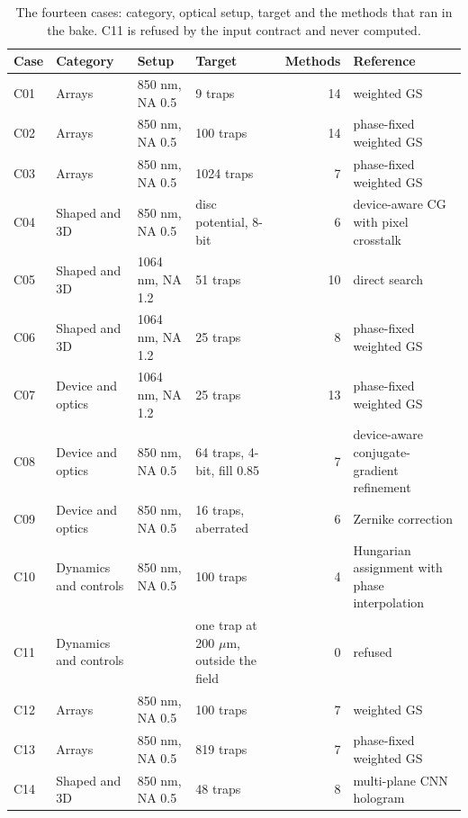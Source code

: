\begin{table}[t]\centering\footnotesize
\caption{The fourteen cases: category, optical setup, target and the methods that ran in the bake. C11 is refused by the input contract and never computed.}\label{tab:cases}
\begin{tabular}{@{}l l l l r >{\raggedright\arraybackslash}p{}@{}}\toprule Case & Category & Setup & Target & Methods & Reference\\\midrule
C01 & Arrays & 850 nm, NA 0.5 & 9 traps & 14 & weighted GS\\
C02 & Arrays & 850 nm, NA 0.5 & 100 traps & 14 & phase-fixed weighted GS\\
C03 & Arrays & 850 nm, NA 0.5 & 1024 traps & 7 & phase-fixed weighted GS\\
C04 & Shaped and 3D & 850 nm, NA 0.5 & disc potential, 8-bit & 6 & device-aware CG with pixel crosstalk\\
C05 & Shaped and 3D & 1064 nm, NA 1.2 & 51 traps & 10 & direct search\\
C06 & Shaped and 3D & 1064 nm, NA 1.2 & 25 traps & 8 & phase-fixed weighted GS\\
C07 & Device and optics & 1064 nm, NA 1.2 & 25 traps & 13 & phase-fixed weighted GS\\
C08 & Device and optics & 850 nm, NA 0.5 & 64 traps, 4-bit, fill 0.85 & 7 & device-aware conjugate-gradient refinement\\
C09 & Device and optics & 850 nm, NA 0.5 & 16 traps, aberrated & 6 & Zernike correction\\
C10 & Dynamics and controls & 850 nm, NA 0.5 & 100 traps & 4 & Hungarian assignment with phase interpolation\\
C11 & Dynamics and controls & & one trap at 200 $\mu$m, outside the field & 0 & refused\\
C12 & Arrays & 850 nm, NA 0.5 & 100 traps & 7 & weighted GS\\
C13 & Arrays & 850 nm, NA 0.5 & 819 traps & 7 & phase-fixed weighted GS\\
C14 & Shaped and 3D & 850 nm, NA 0.5 & 48 traps & 8 & multi-plane CNN hologram\\
\bottomrule\end{tabular}\end{table}
